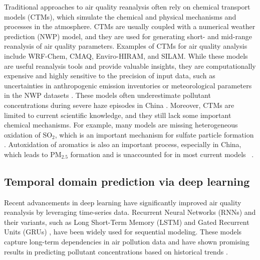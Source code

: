 Traditional approaches to air quality reanalysis often rely on chemical transport models (CTMs), which simulate the chemical and physical mechanisms and processes in the atmosphere. CTMs are usually coupled with a numerical weather prediction (NWP) model, and they are used for generating short- and mid-range reanalysis of air quality parameters\cite{Baklanov2011,gmd-10-2971-2017}. Examples of CTMs for air quality analysis include WRF-Chem\cite{Peckham2012}, CMAQ\cite{gmd-10-1703-2017}, Enviro-HIRAM\cite{gmd-10-2971-2017}, and SILAM\cite{SOFIEV2006674}. While these models are useful reanalysis tools and provide valuable insights, they are computationally expensive and highly sensitive to the precision of input data, such as uncertainties in anthropogenic emission inventories or meteorological parameters in the NWP datasets \cite{NI2018550,Foreback02042024}. These models often underestimate pollutant concentrations during severe haze episodes in China \cite{acp-22-5265-2022}. Moreover, CTMs are limited to current scientific knowledge, and they still lack some important chemical mechanisms. For example, many models are missing heterogeneous oxidation of SO$_2$, which is an important mechanism for sulfate particle formation \cite{Ma02112023}. Autoxidation of aromatics is also an important process, especially in China, which leads to PM$_{2.5}$ formation and is unaccounted for in most current models ~\cite{Pichelstorfer2024,Foreback2025_PREPRINT}.

\subsection{Temporal domain prediction via deep learning}
Recent advancements in deep learning have significantly improved air quality reanalysis by leveraging time-series data. Recurrent Neural Networks (RNNs) and their variants, such as Long Short-Term Memory (LSTM) \cite{hochreiter1997long} and Gated Recurrent Units (GRUs) \cite{cho2014learning}, have been widely used for sequential modeling. These models capture long-term dependencies in air pollution data and have shown promising results in predicting pollutant concentrations based on historical trends \cite{xu2021long}.

